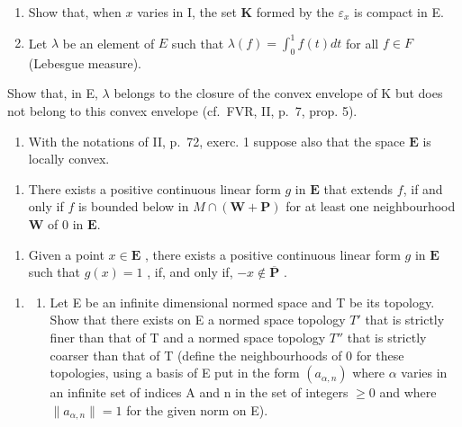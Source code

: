\begin{enumerate}
\def\labelenumi{\alph{enumi})}
\item
  Show that, when \(x\) varies in I, the set \(\mathbf{K}\) formed by the \(\varepsilon_x\) is compact in E.
\item
  Let \(\lambda\) be an element of \(E\) such that \(\lambda(f) = \int_0^1 f(t)dt\) for all \(f\in F\) (Lebesgue measure).
\end{enumerate}

Show that, in E, \(\lambda\) belongs to the closure of the convex envelope of K but does not belong to this convex envelope (cf.~FVR, II, p.~7, prop. 5).

\begin{enumerate}
\def\labelenumi{\arabic{enumi})}
\setcounter{enumi}{3}
\tightlist
\item
  With the notations of II, p.~72, exerc. 1 suppose also that the space \(\mathbf{E}\) is locally convex.
\end{enumerate}

\begin{enumerate}
\def\labelenumi{\alph{enumi})}
\item
  There exists a positive continuous linear form \(g\) in \(\mathbf{E}\) that extends \(f\), if and only if \(f\) is bounded below in \(M \cap (\mathbf{W} + \mathbf{P})\) for at least one neighbourhood \(\mathbf{W}\) of 0 in \(\mathbf{E}\).
\end{enumerate}

\begin{enumerate}
\def\labelenumi{\alph{enumi})}
\setcounter{enumi}{1}
\tightlist
\item
  Given a point \(x \in \mathbf{E}\) , there exists a positive continuous linear form \(g\) in \(\mathbf{E}\) such that \(g(x) = 1\) , if, and only if, \(-x \notin \overline{\mathbf{P}}\) .
\end{enumerate}

\begin{enumerate}
\def\labelenumi{\arabic{enumi})}
\setcounter{enumi}{4}
\tightlist
\item
  \begin{enumerate}
  \def\labelenumii{\alph{enumii})}
  \tightlist
  \item
    Let E be an infinite dimensional normed space and T be its topology. Show that there exists on E a normed space topology \(T'\) that is strictly finer than that of T and a normed space topology \(T''\) that is strictly coarser than that of T (define the neighbourhoods of 0 for these topologies, using a basis of E put in the form \((a_{\alpha,n})\) where \(\alpha\) varies in an infinite set of indices A and n in the set of integers \(\geqslant 0\) and where \(\|a_{\alpha,n}\| = 1\) for the given norm on E).
  \end{enumerate}
\end{enumerate}

